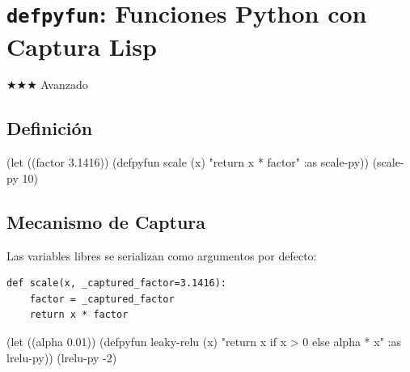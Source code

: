 \chapter{\texttt{defpyfun}: Funciones Python con Captura Lisp}
\label{chap:defpyfun}
{\huge$\bigstar$}{\huge$\bigstar$}{\huge$\bigstar$} Avanzado

\section{Definición}
\begin{lispcode}
(let ((factor 3.1416))
  (defpyfun scale (x) "return x * factor" :as scale-py))
(scale-py 10)
\end{lispcode}

\section{Mecanismo de Captura}
Las variables libres se serializan como argumentos por defecto:
\begin{verbatim}
def scale(x, _captured_factor=3.1416):
    factor = _captured_factor
    return x * factor
\end{verbatim}

\begin{examplebox}[title=Leaky ReLU con parámetros capturados]
\begin{lispcode}
(let ((alpha 0.01))
  (defpyfun leaky-relu (x) "return x if x > 0 else alpha * x" :as lrelu-py))
(lrelu-py -2)
\end{lispcode}
\end{examplebox}

